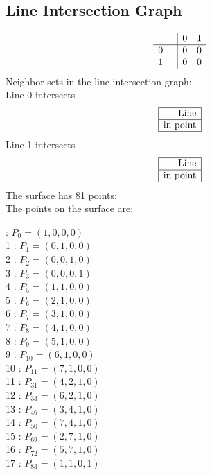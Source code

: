 \documentclass{article}
\begin{document}
{\subsection*{Line Intersection Graph}
{\arraycolsep=1pt
$$
\begin{array}{rr|*{2}r}
 &  & 0 & 1\\
\hline
0 &  & 0 & 0\\
1 &  & 0 & 0\\
\end{array}
$$
}%
Neighbor sets in the line intersection graph:\\
Line 0 intersects 
$$
\begin{array}{|r*{0}{|c}|}
\hline
\mbox{Line} \\
\hline
\mbox{in point} \\
\hline
\end{array}
$$
Line 1 intersects 
$$
\begin{array}{|r*{0}{|c}|}
\hline
\mbox{Line} \\
\hline
\mbox{in point} \\
\hline
\end{array}
$$
The surface has 81 points:\\
The points on the surface are:\\
\begin{multicols}{3}
 : $P_{0}=( 1, 0, 0, 0 )$\\
1 : $P_{1}=( 0, 1, 0, 0 )$\\
2 : $P_{2}=( 0, 0, 1, 0 )$\\
3 : $P_{3}=( 0, 0, 0, 1 )$\\
4 : $P_{5}=( 1, 1, 0, 0 )$\\
5 : $P_{6}=( 2, 1, 0, 0 )$\\
6 : $P_{7}=( 3, 1, 0, 0 )$\\
7 : $P_{8}=( 4, 1, 0, 0 )$\\
8 : $P_{9}=( 5, 1, 0, 0 )$\\
9 : $P_{10}=( 6, 1, 0, 0 )$\\
10 : $P_{11}=( 7, 1, 0, 0 )$\\
11 : $P_{31}=( 4, 2, 1, 0 )$\\
12 : $P_{33}=( 6, 2, 1, 0 )$\\
13 : $P_{46}=( 3, 4, 1, 0 )$\\
14 : $P_{50}=( 7, 4, 1, 0 )$\\
15 : $P_{69}=( 2, 7, 1, 0 )$\\
16 : $P_{72}=( 5, 7, 1, 0 )$\\
17 : $P_{83}=( 1, 1, 0, 1 )$\\

\end{multicols}}
\end{document}
